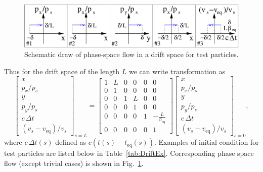 \documentclass[]{article}
\begin{document}
\begin{figure}[t!]\centering
\includegraphics[width=\linewidth]{DriftEx.pdf}
\caption{Schematic draw of phase-space flow in a drift space
		for test particles.}
\label{fig:DriftEx}
\end{figure}

Thus for the drift space of the length $L$ we can write transformation as
\[
\begin{bmatrix}
x			\\ p_x/p_s				\\
y			\\ p_y/p_s				\\
c\,\Delta t \\ (v_s-v_{\text{eq}})/v_s
\end{bmatrix}_{s=L} =
\begin{bmatrix}
1 & L & 0 & 0 & 0 & 0								\\
0 & 1 & 0 & 0 & 0 & 0								\\
0 & 0 & 1 & L & 0 & 0								\\
0 & 0 & 0 & 1 & 0 & 0								\\
0 & 0 & 0 & 0 & 1 & -\frac{L}{\beta_{\text{eq}}}	\\
0 & 0 & 0 & 0 & 0 & 1
\end{bmatrix}
\begin{bmatrix}
x			\\ p_x/p_s				\\
y			\\ p_y/p_s				\\
c\,\Delta t \\ (v_s-v_{\text{eq}})/v_s
\end{bmatrix}_{s=0},
\]
where $c\,\Delta t(s)$ defined as $c(t(s) - t_{\text{eq}}(s))$.
Examples of initial condition for test particles are listed below in
Table~\ref{tab:DriftEx}.
Corresponding phase space flow (except trivial cases) is shown in
Fig.~\ref{fig:DriftEx}.
\end{document}
